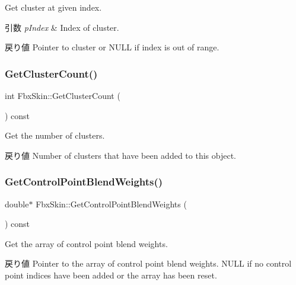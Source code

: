Get cluster at given index. 
\begin{DoxyParams}{引数}
{\em p\+Index} & Index of cluster. \\
\hline
\end{DoxyParams}
\begin{DoxyReturn}{戻り値}
Pointer to cluster or {\ttfamily N\+U\+LL} if index is out of range. 
\end{DoxyReturn}
\mbox{\label{class_fbx_skin_aa2f08718935873004ecfa0f7018830fb}} 
\subsubsection{\texorpdfstring{Get\+Cluster\+Count()}{GetClusterCount()}}
{\footnotesize\ttfamily int Fbx\+Skin\+::\+Get\+Cluster\+Count (\begin{DoxyParamCaption}{ }\end{DoxyParamCaption}) const}

Get the number of clusters. \begin{DoxyReturn}{戻り値}
Number of clusters that have been added to this object. 
\end{DoxyReturn}
\mbox{\label{class_fbx_skin_a08bdcf744096f73b47a1f463ab1a5522}} 
\subsubsection{\texorpdfstring{Get\+Control\+Point\+Blend\+Weights()}{GetControlPointBlendWeights()}}
{\footnotesize\ttfamily double$\ast$ Fbx\+Skin\+::\+Get\+Control\+Point\+Blend\+Weights (\begin{DoxyParamCaption}{ }\end{DoxyParamCaption}) const}

Get the array of control point blend weights. \begin{DoxyReturn}{戻り値}
Pointer to the array of control point blend weights. {\ttfamily N\+U\+LL} if no control point indices have been added or the array has been reset. 
\end{DoxyReturn}
\mbox{\label{class_fbx_skin_afbf0703d26ae058ca5757b6051df29a0}} 
